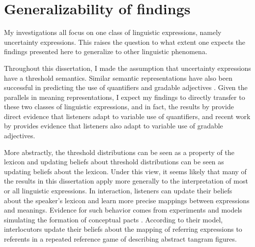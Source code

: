 \section{Generalizability of findings}

My investigations all focus on one class of linguistic expressions, namely uncertainty expressions. This raises the question
to what extent one expects the findings presented here to generalize to other linguistic phenomena.

Throughout this dissertation, I made the assumption that uncertainty expressions have a threshold semantics. Similar semantic
representations have also been successful in predicting the use of quantifiers  and gradable adjectives . Given
the parallels in meaning representations, I expect my findings to directly transfer to these two classes of linguistic expressions, and in fact, 
the results by \textcite{Yildirim2016} provide direct evidence that listeners adapt to variable use of quantifiers, and recent work by \textcite{Xiang2020} 
provides evidence that listeners also adapt to variable use of gradable adjectives.

More abstractly, the threshold distributions can be seen as a property of the lexicon and updating beliefs about threshold distributions can be seen as
updating beliefs about the lexicon. Under this view, it seems likely that many of the results in this dissertation apply more generally to the interpretation of most or all linguistic expressions.
In interaction, listeners can update their beliefs about the speaker's lexicon and learn more precise mappings between expressions and meanings. Evidence for such behavior comes from  experiments and models simulating the formation of conceptual pacts \cite{Hawkins2017}. According to their model, interlocutors update their beliefs about the mapping of referring expressions
to referents in a repeated reference game of describing abstract tangram figures.


